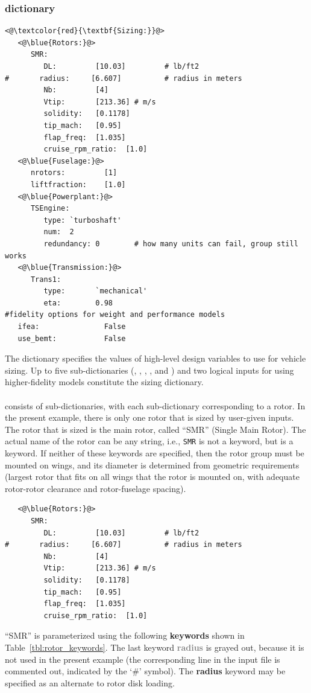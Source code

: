 \subsubsection{ dictionary}
\begin{lstlisting}
<@\textcolor{red}{\textbf{Sizing:}}@>
   <@\blue{Rotors:}@>
      SMR:
         DL:         [10.03]         # lb/ft2
#       radius:     [6.607]          # radius in meters
         Nb:         [4]  
         Vtip:       [213.36] # m/s
         solidity:   [0.1178]
         tip_mach:   [0.95]
         flap_freq:  [1.035]
         cruise_rpm_ratio:  [1.0]
   <@\blue{Fuselage:}@>
      nrotors:         [1]
      liftfraction:    [1.0]
   <@\blue{Powerplant:}@>
      TSEngine: 
         type: `turboshaft'
         num:  2
         redundancy: 0        # how many units can fail, group still works
   <@\blue{Transmission:}@>
      Trans1: 
         type:       `mechanical'
         eta:        0.98
#fidelity options for weight and performance models
   ifea:               False
   use_bemt:           False
\end{lstlisting}

The  dictionary specifies the values of high-level design variables to use for vehicle sizing. Up to five sub-dictionaries (, , , , and ) and two logical inputs for using higher-fidelity models constitute the sizing dictionary.
\paragraph{}
 consists of sub-dictionaries, with each sub-dictionary corresponding to a rotor. In the present example, there is only one rotor that is sized by user-given inputs. The rotor that is sized is the main rotor, called ``SMR'' (Single Main Rotor). The actual name of the rotor can be any string, i.e., \texttt{SMR} is not a keyword, but \texttt{} is a keyword. If neither of these keywords are specified, then the rotor group must be mounted on wings, and its diameter is determined from geometric requirements (largest rotor that fits on all wings that the rotor is mounted on, with adequate rotor-rotor clearance and rotor-fuselage spacing).
\begin{lstlisting}
   <@\blue{Rotors:}@>
      SMR:
         DL:         [10.03]         # lb/ft2
#       radius:     [6.607]          # radius in meters
         Nb:         [4]  
         Vtip:       [213.36] # m/s
         solidity:   [0.1178]
         tip_mach:   [0.95]
         flap_freq:  [1.035]
         cruise_rpm_ratio:  [1.0]
\end{lstlisting}
\noindent ``SMR'' is parameterized using the following \textbf{keywords} shown in Table~\ref{tbl:rotor_keywords}. The last keyword \textcolor{gray}{\textbf{radius}} is grayed out, because it is not used in the present example (the corresponding line in the input file is commented out, indicated by the `\#' symbol). The \textbf{radius} keyword may be specified as an alternate to rotor disk loading. 

